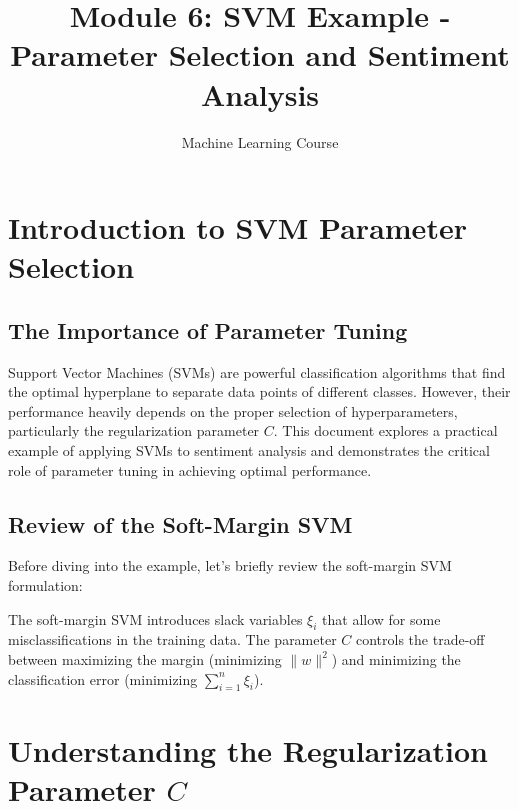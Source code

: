 \documentclass{article}
\title{Module 6: SVM Example - Parameter Selection and Sentiment Analysis}
\author{Machine Learning Course}
\date{}
\begin{document}
\maketitle
\tableofcontents
\newpage

\section{Introduction to SVM Parameter Selection}

\subsection{The Importance of Parameter Tuning}
Support Vector Machines (SVMs) are powerful classification algorithms that find the optimal hyperplane to separate data points of different classes. However, their performance heavily depends on the proper selection of hyperparameters, particularly the regularization parameter $C$. This document explores a practical example of applying SVMs to sentiment analysis and demonstrates the critical role of parameter tuning in achieving optimal performance.

\subsection{Review of the Soft-Margin SVM}
Before diving into the example, let's briefly review the soft-margin SVM formulation:


The soft-margin SVM introduces slack variables $\xi_i$ that allow for some misclassifications in the training data. The parameter $C$ controls the trade-off between maximizing the margin (minimizing $\|w\|^2$) and minimizing the classification error (minimizing $\sum_{i=1}^{n}\xi_{i}$).

\section{Understanding the Regularization Parameter $C$}
\end{document}
